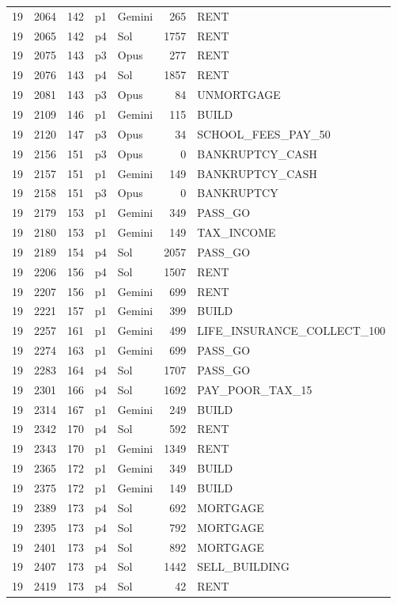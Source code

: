 \begin{longtable}{r r r l l r >{\ttfamily}l}
19 & 2064 & 142 & p1 & Gemini & 265 & RENT \\
19 & 2065 & 142 & p4 & Sol & 1757 & RENT \\
19 & 2075 & 143 & p3 & Opus & 277 & RENT \\
19 & 2076 & 143 & p4 & Sol & 1857 & RENT \\
19 & 2081 & 143 & p3 & Opus & 84 & UNMORTGAGE \\
19 & 2109 & 146 & p1 & Gemini & 115 & BUILD \\
19 & 2120 & 147 & p3 & Opus & 34 & SCHOOL\_FEES\_PAY\_50 \\
19 & 2156 & 151 & p3 & Opus & 0 & BANKRUPTCY\_CASH \\
19 & 2157 & 151 & p1 & Gemini & 149 & BANKRUPTCY\_CASH \\
19 & 2158 & 151 & p3 & Opus & 0 & BANKRUPTCY \\
19 & 2179 & 153 & p1 & Gemini & 349 & PASS\_GO \\
19 & 2180 & 153 & p1 & Gemini & 149 & TAX\_INCOME \\
19 & 2189 & 154 & p4 & Sol & 2057 & PASS\_GO \\
19 & 2206 & 156 & p4 & Sol & 1507 & RENT \\
19 & 2207 & 156 & p1 & Gemini & 699 & RENT \\
19 & 2221 & 157 & p1 & Gemini & 399 & BUILD \\
19 & 2257 & 161 & p1 & Gemini & 499 & LIFE\_INSURANCE\_COLLECT\_100 \\
19 & 2274 & 163 & p1 & Gemini & 699 & PASS\_GO \\
19 & 2283 & 164 & p4 & Sol & 1707 & PASS\_GO \\
19 & 2301 & 166 & p4 & Sol & 1692 & PAY\_POOR\_TAX\_15 \\
19 & 2314 & 167 & p1 & Gemini & 249 & BUILD \\
19 & 2342 & 170 & p4 & Sol & 592 & RENT \\
19 & 2343 & 170 & p1 & Gemini & 1349 & RENT \\
19 & 2365 & 172 & p1 & Gemini & 349 & BUILD \\
19 & 2375 & 172 & p1 & Gemini & 149 & BUILD \\
19 & 2389 & 173 & p4 & Sol & 692 & MORTGAGE \\
19 & 2395 & 173 & p4 & Sol & 792 & MORTGAGE \\
19 & 2401 & 173 & p4 & Sol & 892 & MORTGAGE \\
19 & 2407 & 173 & p4 & Sol & 1442 & SELL\_BUILDING \\
19 & 2419 & 173 & p4 & Sol & 42 & RENT \\

\end{longtable}
